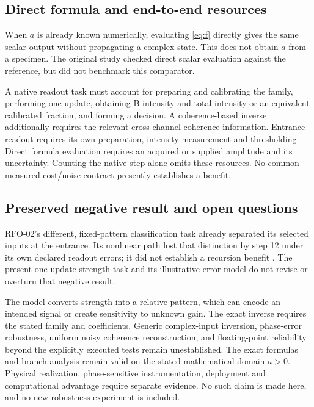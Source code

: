 \documentclass[11pt,a4paper]{article}
\begin{document}
\subsection{Direct formula and end-to-end resources}
When $a$ is already known numerically, evaluating \eqref{eq:f} directly gives the same scalar output without propagating a complex state. This does not obtain $a$ from a specimen. The original study checked direct scalar evaluation against the reference, but did not benchmark this comparator.

A native readout task must account for preparing and calibrating the family, performing one update, obtaining B intensity and total intensity or an equivalent calibrated fraction, and forming a decision. A coherence-based inverse additionally requires the relevant cross-channel coherence information. Entrance readout requires its own preparation, intensity measurement and thresholding. Direct formula evaluation requires an acquired or supplied amplitude and its uncertainty. Counting the native step alone omits these resources. No common measured cost/noise contract presently establishes a benefit.

\subsection{Preserved negative result and open questions}
RFO-02's different, fixed-pattern classification task already separated its selected inputs at the entrance. Its nonlinear path lost that distinction by step 12 under its own declared readout errors; it did not establish a recursion benefit \cite[Sections 5 and 8]{rfo02}. The present one-update strength task and its illustrative error model do not revise or overturn that negative result.

The model converts strength into a relative pattern, which can encode an intended signal or create sensitivity to unknown gain. The exact inverse requires the stated family and coefficients. Generic complex-input inversion, phase-error robustness, uniform noisy coherence reconstruction, and floating-point reliability beyond the explicitly executed tests remain unestablished. The exact formulas and branch analysis remain valid on the stated mathematical domain $a>0$. Physical realization, phase-sensitive instrumentation, deployment and computational advantage require separate evidence. No such claim is made here, and no new robustness experiment is included.

\clearpage
\end{document}
